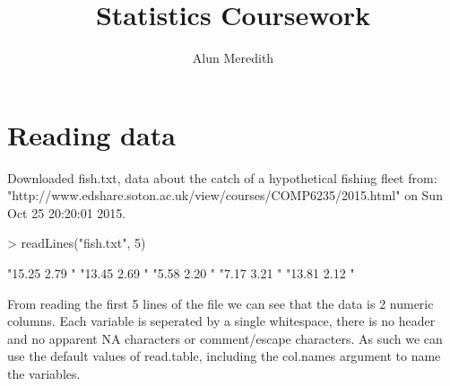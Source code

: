 \documentclass{article}
\begin{document}



\title{Statistics Coursework}
\author{Alun Meredith}
\maketitle
\section{Reading data}
Downloaded fish.txt, data about the catch of a hypothetical fishing fleet from:\\"http://www.edshare.soton.ac.uk/view/courses/COMP6235/2015.html" on Sun Oct 25 20:20:01 2015. 
\begin{Schunk}
\begin{Sinput}
> readLines("fish.txt", 5)
\end{Sinput}
\begin{Soutput}
[1] "15.25 2.79 " "13.45 2.69 " "5.58 2.20 "  "7.17 3.21 "  "13.81 2.12 "
\end{Soutput}
\end{Schunk}
From reading the first 5 lines of the file we can see that the data is 2 numeric columns. Each variable is seperated by a single whitespace, there is no header and no apparent NA characters or comment/escape characters. As such we can use the default values of read.table, including the col.names argument to name the variables.
\end{document}
